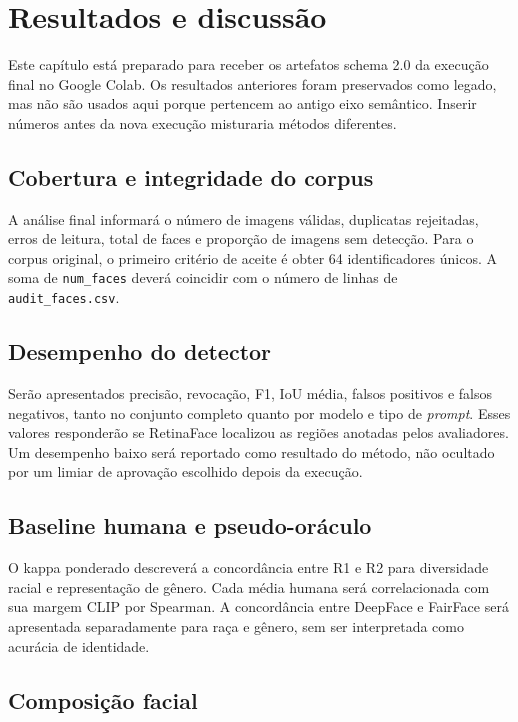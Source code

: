 \chapter{Resultados e discussão}
\label{cap:resultados}

Este capítulo está preparado para receber os artefatos schema 2.0 da execução final no Google Colab. Os resultados anteriores foram preservados como legado, mas não são usados aqui porque pertencem ao antigo eixo semântico. Inserir números antes da nova execução misturaria métodos diferentes.

\section{Cobertura e integridade do corpus}

A análise final informará o número de imagens válidas, duplicatas rejeitadas, erros de leitura, total de faces e proporção de imagens sem detecção. Para o corpus original, o primeiro critério de aceite é obter 64 identificadores únicos. A soma de \texttt{num\_faces} deverá coincidir com o número de linhas de \texttt{audit\_\allowbreak faces.csv}.

\section{Desempenho do detector}

Serão apresentados precisão, revocação, F1, IoU média, falsos positivos e falsos negativos, tanto no conjunto completo quanto por modelo e tipo de \textit{prompt}. Esses valores responderão se RetinaFace localizou as regiões anotadas pelos avaliadores. Um desempenho baixo será reportado como resultado do método, não ocultado por um limiar de aprovação escolhido depois da execução.

\section{Baseline humana e pseudo-oráculo}

O kappa ponderado descreverá a concordância entre R1 e R2 para diversidade racial e representação de gênero. Cada média humana será correlacionada com sua margem CLIP por Spearman. A concordância entre DeepFace e FairFace será apresentada separadamente para raça e gênero, sem ser interpretada como acurácia de identidade.

\section{Composição facial}

